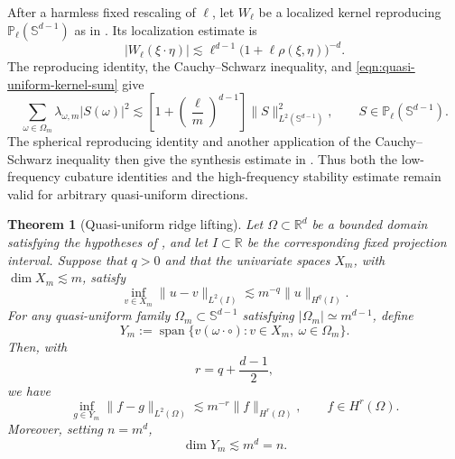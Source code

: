\documentclass{article}
\numberwithin{equation}{section}
\newtheorem{theorem}{Theorem}
\def\RR{\mathbb{R}}
\def\SS{\mathbb{S}}
\begin{document}
After a harmless fixed rescaling of $\ell$, let $W_\ell$ be a localized kernel reproducing $\mathbb P_\ell(\SS^{d-1})$ as in \cite[Proposition~4.1]{petrushev1998approximation}. Its localization estimate is
$$
|W_\ell(\xi\cdot\eta)|
\lesssim
\ell^{d-1}\bigl(1+\ell\rho(\xi,\eta)\bigr)^{-d}.
$$
The reproducing identity, the Cauchy--Schwarz inequality, and \eqref{eqn:quasi-uniform-kernel-sum} give
\begin{equation}\label{eqn:quasi-uniform-mz-lifting}
\sum_{\omega\in\Omega_m}
\lambda_{\omega,m}|S(\omega)|^2
\lesssim
\left[1+\left(\frac{\ell}{m}\right)^{d-1}\right]
\|S\|_{L^2(\SS^{d-1})}^2,
\qquad
S\in\mathbb P_\ell(\SS^{d-1}).
\end{equation}
The spherical reproducing identity and another application of the Cauchy--Schwarz inequality then give the synthesis estimate in \cite[Lemma~4.4]{petrushev1998approximation}. Thus both the low-frequency cubature identities and the high-frequency stability estimate remain valid for arbitrary quasi-uniform directions.

\begin{theorem}[Quasi-uniform ridge lifting]\label{thm:quasi-uniform-ridge-lifting}
Let $\Omega\subset\RR^d$ be a bounded domain satisfying the hypotheses of \cite[Theorem~8.2]{petrushev1998approximation}, and let $I\subset\RR$ be the corresponding fixed projection interval. Suppose that $q>0$ and that the univariate spaces $X_m$, with $\dim X_m\lesssim m$, satisfy
\begin{equation}\label{eqn:univariate-assumption-appendix}
\inf_{v\in X_m}\|u-v\|_{L^2(I)}
\lesssim
m^{-q}\|u\|_{H^q(I)}.
\end{equation}
For any quasi-uniform family $\Omega_m\subset\SS^{d-1}$ satisfying $|\Omega_m|\simeq m^{d-1}$, define
$$
Y_m
:=
\operatorname{span}
\{v(\omega\cdot\circ):v\in X_m,\ \omega\in\Omega_m\}.
$$
Then, with
$$
r=q+\frac{d-1}{2},
$$
we have
\begin{equation}\label{eqn:quasi-uniform-lifting-rate}
\inf_{g\in Y_m}\|f-g\|_{L^2(\Omega)}
\lesssim
m^{-r}\|f\|_{H^r(\Omega)},
\qquad
f\in H^r(\Omega).
\end{equation}
Moreover, setting $n=m^d$,
$$
\dim Y_m\lesssim m^d=n.
$$
\end{theorem}
\end{document}
